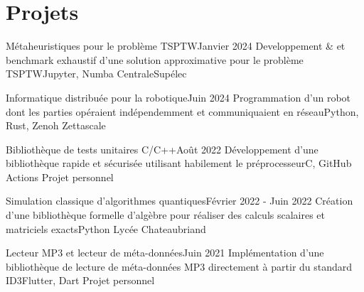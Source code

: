 \section{Projets}
\resumeSubHeadingListStart
    \resumeProjectHeading
    {Métaheuristiques pour le problème TSPTW}{Janvier 2024}
    {Developpement \& et benchmark exhaustif d'une solution approximative pour le problème TSPTW}{Jupyter, Numba}
    {}
    {CentraleSupélec}

    \resumeProjectHeading
    {Informatique distribuée pour la robotique}{Juin 2024}
    {Programmation d'un robot dont les parties opéraient indépendemment et communiquaient en réseau}{Python, Rust, Zenoh}
    {}
    {Zettascale}

    \resumeProjectHeading
    {Bibliothèque de tests unitaires C/C++}{\quad Août 2022}
    {Développement d'une bibliothèque rapide et sécurisée utilisant habilement le préprocesseur}{C, GitHub Actions}
    {}
    {Projet personnel}
    \vspace{-7pt}
    \resumeItemListStart
    \resumeItemListEnd

    \resumeProjectHeading
    {Simulation classique d'algorithmes quantiques}{Février 2022 - Juin 2022}
    {Création d'une bibliothèque formelle d'algèbre pour réaliser des calculs scalaires et matriciels exacts}{Python}
    {}
    {Lycée Chateaubriand}
    \vspace{-7pt}
    \resumeItemListStart
    \resumeItemListEnd

    \resumeProjectHeading
    {Lecteur MP3 et lecteur de méta-données}{Juin 2021}
    {Implémentation d'une bibliothèque de lecture de méta-données MP3 directement à partir du standard ID3}{Flutter, Dart}
    {}
    {Projet personnel}
    \vspace{-7pt}
    \resumeItemListStart
    \resumeItemListEnd

\resumeSubHeadingListEnd
